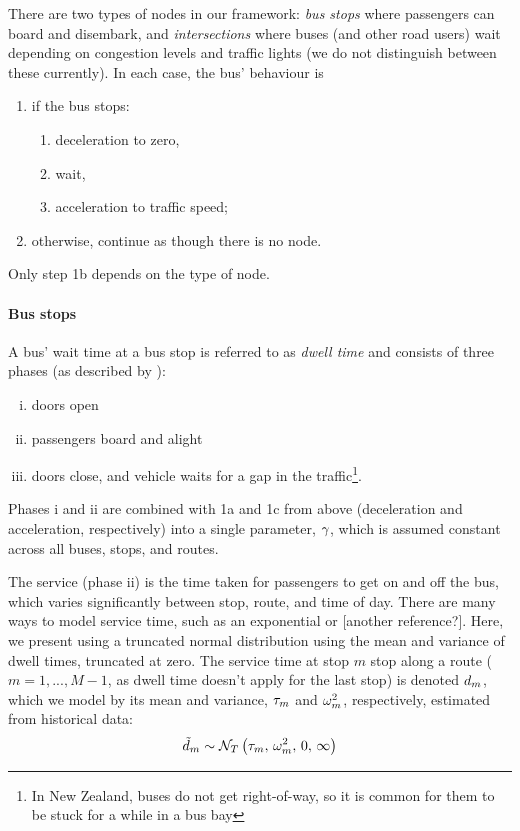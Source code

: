 There are two types of nodes in our framework: \emph{bus stops} where passengers can board and disembark, and \emph{intersections} where buses (and other road users) wait depending on congestion levels and traffic lights (we do not distinguish between these currently). In each case, the bus' behaviour is
\begin{enumerate}
\item if the bus stops:
    \begin{enumerate}
    \item deceleration to zero,
    \item wait,
    \item acceleration to traffic speed;
    \end{enumerate}
\item otherwise, continue as though there is no node.
\end{enumerate}
Only step 1b depends on the type of node.



\paragraph{Bus stops}

A bus' wait time at a bus stop is referred to as \emph{dwell time} and consists of three phases (as described by \citet{Hans_2015}):
\begin{enumerate}[i.]
\item doors open
\item passengers board and alight
\item doors close, and vehicle waits for a gap in the traffic\footnote{In New Zealand, buses do not get right-of-way, so it is common for them to be stuck for a while in a bus bay}.
\end{enumerate}
Phases i and ii are combined with 1a and 1c from above (deceleration and acceleration, respectively) into a single parameter, $\gamma$, which is assumed constant across all buses, stops, and routes.


The service (phase ii) is the time taken for passengers to get on and off the bus, which varies significantly between stop, route, and time of day. There are many ways to model service time, such as an exponential \citep{Hans_2015} or [another reference?]. Here, we present using a truncated normal distribution using the mean and variance of dwell times, truncated at zero. The service time at stop $m$ stop along a route ($m=1,...,M-1$, as dwell time doesn't apply for the last stop) is denoted $d_m$, which we model by its mean and variance, $\tau_m$ and $\omega^2_m$, respectively, estimated from historical data:
\begin{equation}
\label{eq:stop_dwell_time}
\tilde d_m \sim \mathcal{N}_T\left(\tau_m,\, \omega^2_m,\, 0,\, \infty\right)
\end{equation}

